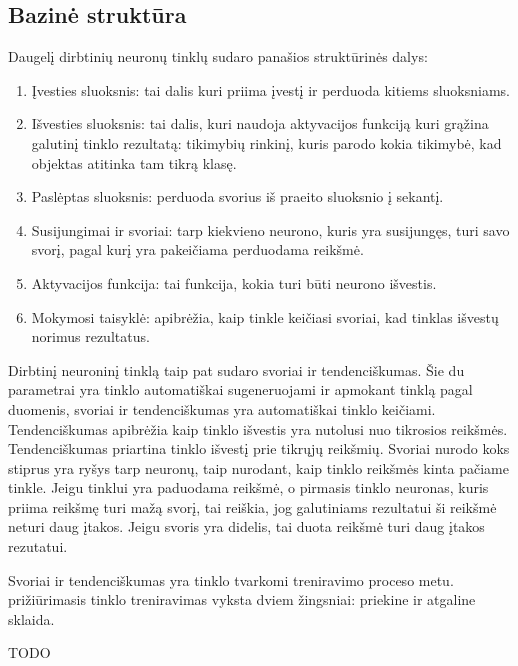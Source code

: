 \documentclass{VUMIFInfKursinis}
\begin{document}
\subsection{Bazinė struktūra}
Daugelį dirbtinių neuronų tinklų sudaro panašios struktūrinės dalys:
\begin{enumerate}
  \item Įvesties sluoksnis: tai dalis kuri priima įvestį ir perduoda kitiems sluoksniams.
  \item Išvesties sluoksnis: tai dalis, kuri naudoja aktyvacijos funkciją kuri grąžina galutinį tinklo rezultatą: tikimybių rinkinį, kuris parodo kokia tikimybė, kad objektas atitinka tam tikrą klasę.
  \item Paslėptas sluoksnis: perduoda svorius iš praeito sluoksnio į sekantį.
  \item Susijungimai ir svoriai: tarp kiekvieno neurono, kuris yra susijungęs, turi savo svorį, pagal kurį yra pakeičiama perduodama reikšmė.
  \item Aktyvacijos funkcija: tai funkcija, kokia turi būti neurono išvestis.
  \item Mokymosi taisyklė: apibrėžia, kaip tinkle keičiasi svoriai, kad tinklas išvestų norimus rezultatus.
\end{enumerate}
\par
Dirbtinį neuroninį tinklą taip pat sudaro svoriai ir tendenciškumas. Šie du parametrai yra
tinklo automatiškai sugeneruojami ir apmokant tinklą pagal duomenis, svoriai ir tendenciškumas
yra automatiškai tinklo keičiami. Tendenciškumas apibrėžia kaip tinklo išvestis yra nutolusi
nuo tikrosios reikšmės. Tendenciškumas priartina tinklo išvestį prie tikrųjų reikšmių. Svoriai
nurodo koks stiprus yra ryšys tarp neuronų, taip nurodant, kaip tinklo reikšmės kinta pačiame tinkle.
Jeigu tinklui yra paduodama reikšmė, o pirmasis tinklo neuronas, kuris priima reikšmę turi mažą
svorį, tai reiškia, jog galutiniams rezultatui ši reikšmė neturi daug įtakos. Jeigu svoris yra
didelis, tai duota reikšmė turi daug įtakos rezutatui.
\par
Svoriai ir tendenciškumas yra tinklo tvarkomi treniravimo proceso metu.
prižiūrimasis tinklo treniravimas vyksta dviem žingsniai: priekine ir atgaline sklaida.


TODO
\end{document}
